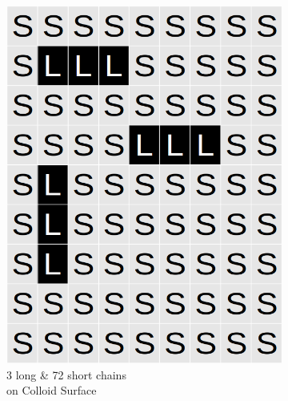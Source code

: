 \documentclass[journal=mamobx,manuscript=article]{achemso}
\begin{document}
\begin{figure}[H]
\begin{subfigure}[b]{0.4\textwidth}
        \includegraphics[scale=0.15]{fig8d.png}
        \caption{3 long \& 72 short chains\\ on Colloid Surface}
        \label{fig:D}
    \end{subfigure}
    \begin{subfigure}[b]{0.4\textwidth}

\end{subfigure}
\end{figure}
\end{document}

